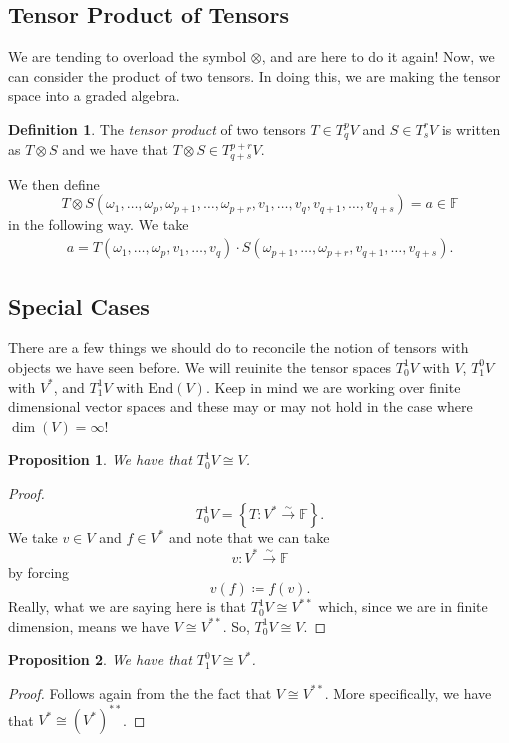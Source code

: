 \documentclass[12pt]{article}
\newcommand{\field}{\mathbb{F}}
\newcommand{\linmap}{\overset{\sim}{\longrightarrow}}
\newcommand{\End}{\mathrm{End}}
\newcommand{\tspace}{T_q^pV}
\newtheorem{proposition}{Proposition}[section]
\theoremstyle{definition}
\newtheorem{definition}{Definition}[section]
\begin{document}
\subsection{Tensor Product of Tensors}
We are tending to overload the symbol $\otimes$, and are here to do it again!  Now, we can consider the product of two tensors.  In doing this, we are making the tensor space into a graded algebra. 

\begin{definition}
The \emph{tensor product} of two tensors $T\in \tspace$ and $S\in T_s^rV$ is written as $T\otimes S$ and we have that $T\otimes S \in T_{q+s}^{p+r}V$. 

We then define
\[
T\otimes S(\omega_1,\dots,\omega_p,\omega_{p+1},\dots,\omega_{p+r},v_1,\dots,v_q,v_{q+1},\dots,v_{q+s})=a\in \field
\]
in the following way.  We take
\begin{align*}
a=T(\omega_1,\dots,\omega_p,v_1,\dots,v_q)\cdot S(\omega_{p+1},\dots,\omega_{p+r},v_{q+1},\dots,v_{q+s}). 
\end{align*}
\end{definition}

\subsection{Special Cases}
There are a few things we should do to reconcile the notion of tensors with objects we have seen before.  We will reuinite the tensor spaces $T_0^1V$ with $V$, $T_1^0V$ with $V^*$, and $T_1^1V$ with $\End(V)$. Keep in mind we are working over finite dimensional vector spaces and these may or may not hold in the case where $\dim(V)=\infty$!

\begin{proposition} 
We have that $T_0^1V\cong V$.
\end{proposition}
\begin{proof}
\[
T_0^1V = \left\{T\colon V^* \linmap \field\right\}.
\]
We take $v\in V$ and $f\in V^*$ and note that we can take
\[
v\colon V^* \linmap \field
\]
by forcing
\[
v(f)\coloneqq f(v).
\]
Really, what we are saying here is that $T_0^1V\cong V^{**}$ which, since we are in finite dimension, means we have $V\cong V^{**}$. So, $T_0^1V\cong V$.
\end{proof}

\begin{proposition}
We have that $T_1^0V\cong V^*$.
\end{proposition}
\begin{proof}
Follows again from the the fact that $V\cong V^{**}$.  More specifically, we have that $V^*\cong (V^*)^{**}$.
\end{proof}
\end{document}
